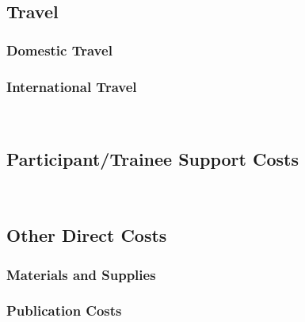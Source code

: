 ~

\subsection*{Travel}


\subsubsection*{Domestic Travel} 

\lipsum[66]

\subsubsection*{International Travel} 

\lipsum[66]

~

\subsection*{Participant/Trainee Support Costs}

\lipsum[66]

~

\subsection*{Other Direct Costs}

\subsubsection*{Materials and Supplies} 

\lipsum[66]

\subsubsection*{Publication Costs} 

